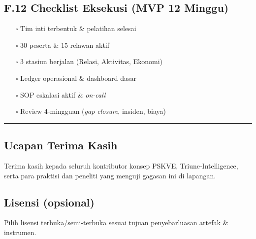 \documentclass[
  letterpaper,
  DIV=11,
  numbers=noendperiod]{scrartcl}
\providecommand{\tightlist}{%
  \setlength{\itemsep}{0pt}\setlength{\parskip}{0pt}}
\begin{document}
\subsection{F.12 Checklist Eksekusi (MVP 12
Minggu)}\label{f.12-checklist-eksekusi-mvp-12-minggu}

\begin{itemize}
\tightlist
\item[$\square$]
  Tim inti terbentuk \& pelatihan selesai
\item[$\square$]
  30 peserta \& 15 relawan aktif
\item[$\square$]
  3 stasiun berjalan (Relasi, Aktivitas, Ekonomi)
\item[$\square$]
  Ledger operasional \& dashboard dasar
\item[$\square$]
  SOP eskalasi aktif \& \emph{on‑call}
\item[$\square$]
  Review 4‑mingguan (\emph{gap closure}, insiden, biaya)
\end{itemize}

\begin{center}\rule{0.5\linewidth}{0.5pt}\end{center}

\subsection{Ucapan Terima Kasih}\label{ucapan-terima-kasih}

Terima kasih kepada seluruh kontributor konsep PSKVE,
Triune‑Intelligence, serta para praktisi dan peneliti yang menguji
gagasan ini di lapangan.

\subsection{Lisensi (opsional)}\label{lisensi-opsional}

Pilih lisensi terbuka/semi‑terbuka sesuai tujuan penyebarluasan artefak
\& instrumen.
\end{document}
